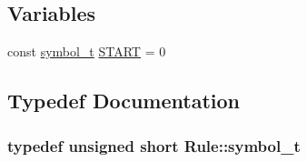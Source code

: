\subsection*{Variables}
\begin{DoxyCompactItemize}
\item 
const \hyperlink{namespace_rule_a99f842acb142ee96951f03ee29eccc9e}{symbol\+\_\+t} \hyperlink{namespace_rule_a99b04a06cea10219deffee01662d82e7}{S\+T\+A\+R\+T} = 0
\end{DoxyCompactItemize}


\subsection{Typedef Documentation}
\hypertarget{namespace_rule_a99f842acb142ee96951f03ee29eccc9e}{
\subsubsection[{symbol\+\_\+t}]{\setlength{\rightskip}{0pt plus 5cm}typedef unsigned short {\bf Rule\+::symbol\+\_\+t}}}\label{namespace_rule_a99f842acb142ee96951f03ee29eccc9e}


